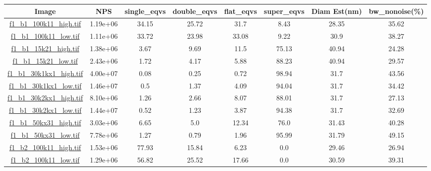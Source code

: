 \begin{table}[h]
\scriptsize
\begin{adjustwidth}{-1cm}{}
\hypertarget{covtableaug_13_12}{\;}
\begin{tabular}{ |c |c |c |c |c |c |c |c |} \hline
{ \bf Image } & { \bf NPS } & { \bf single\_eqvs } & { \bf double\_eqvs } & { \bf flat\_eqvs } & { \bf super\_eqvs } & { \bf Diam Est(nm) } & { \bf bw\_nonoise(\%) }\\ \hline
{\hyperlink{histf1_b1_100k11_high}{\color{blue}f1\_b1\_100k11\_high.tif}} & 1.19e+06 & 34.15 & 25.72 & 31.7 & 8.43 & 28.35 & 35.62\\ \hline
{\hyperlink{histf1_b1_100k11_low}{\color{blue}f1\_b1\_100k11\_low.tif}} & 1.11e+06 & 33.72 & 23.98 & 33.08 & 9.22 & 30.9 & 38.27\\ \hline
{\hyperlink{histf1_b1_15k21_high}{\color{blue}f1\_b1\_15k21\_high.tif}} & 1.38e+06 & 3.67 & 9.69 & 11.5 & 75.13 & 40.94 & 24.28\\ \hline
{\hyperlink{histf1_b1_15k21_low}{\color{blue}f1\_b1\_15k21\_low.tif}} & 2.43e+06 & 1.72 & 4.17 & 5.88 & 88.23 & 40.94 & 29.57\\ \hline
{\hyperlink{histf1_b1_30k1kx1_high}{\color{blue}f1\_b1\_30k1kx1\_high.tif}} & 4.00e+07 & 0.08 & 0.25 & 0.72 & 98.94 & 31.7 & 43.56\\ \hline
{\hyperlink{histf1_b1_30k1kx1_low}{\color{blue}f1\_b1\_30k1kx1\_low.tif}} & 1.46e+07 & 0.5 & 1.37 & 4.09 & 94.04 & 31.7 & 34.42\\ \hline
{\hyperlink{histf1_b1_30k2kx1_high}{\color{blue}f1\_b1\_30k2kx1\_high.tif}} & 8.10e+06 & 1.26 & 2.66 & 8.07 & 88.01 & 31.7 & 27.13\\ \hline
{\hyperlink{histf1_b1_30k2kx1_low}{\color{blue}f1\_b1\_30k2kx1\_low.tif}} & 1.44e+07 & 0.52 & 1.23 & 3.87 & 94.38 & 31.7 & 32.69\\ \hline
{\hyperlink{histf1_b1_50kx31_high}{\color{blue}f1\_b1\_50kx31\_high.tif}} & 3.03e+06 & 6.65 & 5.0 & 12.34 & 76.0 & 31.43 & 40.28\\ \hline
{\hyperlink{histf1_b1_50kx31_low}{\color{blue}f1\_b1\_50kx31\_low.tif}} & 7.78e+06 & 1.27 & 0.79 & 1.96 & 95.99 & 31.79 & 49.15\\ \hline
{\hyperlink{histf1_b2_100k11_high}{\color{blue}f1\_b2\_100k11\_high.tif}} & 1.53e+06 & 77.93 & 15.84 & 6.23 & 0.0 & 29.46 & 26.94\\ \hline
{\hyperlink{histf1_b2_100k11_low}{\color{blue}f1\_b2\_100k11\_low.tif}} & 1.29e+06 & 56.82 & 25.52 & 17.66 & 0.0 & 30.59 & 39.31\\ \hline

\end{tabular}
\end{adjustwidth}
\end{table}
